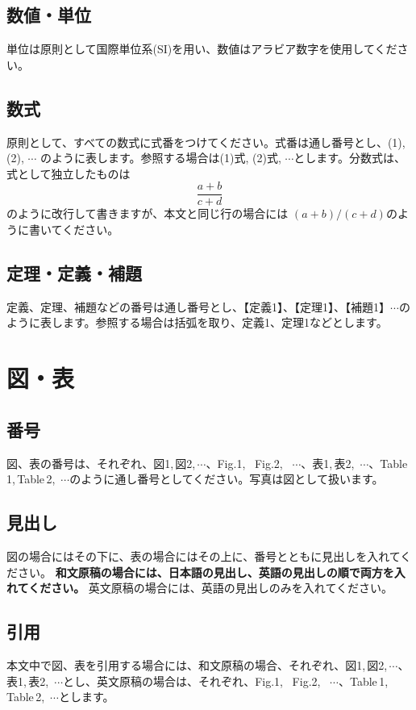 \documentclass{hissymp}
\begin{document}
\subsection{数値・単位}
単位は原則として国際単位系(SI)を用い、数値はアラビア数字を使用してください。

\subsection{数式}
原則として、すべての数式に式番をつけてください。式番は通し番号とし、(1), (2), $ \cdots $ のように表します。参照する場合は(1)式, (2)式, $ \cdots $とします。分数式は、式として独立したものは
\begin{equation}
	\frac{a+b}{c+d}
	\label{formula}
\end{equation}
のように改行して書きますが、本文と同じ行の場合には $ (a+b) / (c+d) $のように書いてください。

\subsection{定理・定義・補題}
定義、定理、補題などの番号は通し番号とし、【定義1】、【定理1】、【補題1】$ \cdots $のように表します。参照する場合は括弧を取り、定義1、定理1などとします。


\section{図・表}

\subsection{番号}
図、表の番号は、それぞれ、図1,\,図2,\,$ \cdots $、Fig.1, \, Fig.2, \, $ \cdots $、表1,\,表2,\, $ \cdots $、Table\,1,\,Table\,2,\, $ \cdots $のように通し番号としてください。写真は図として扱います。

\subsection{見出し}
図の場合にはその下に、表の場合にはその上に、番号とともに見出しを入れてください。
{\bf 和文原稿の場合には、日本語の見出し、英語の見出しの順で両方を入れてください。} 
英文原稿の場合には、英語の見出しのみを入れてください。

\subsection{引用}
本文中で図、表を引用する場合には、和文原稿の場合、それぞれ、図1,\,図2,\,$ \cdots $、表1,\,表2,\, $ \cdots $とし、英文原稿の場合は、それぞれ、Fig.1, \, Fig.2, \, $ \cdots $、Table\,1,\,Table\,2,\, $ \cdots $とします。
\end{document}
